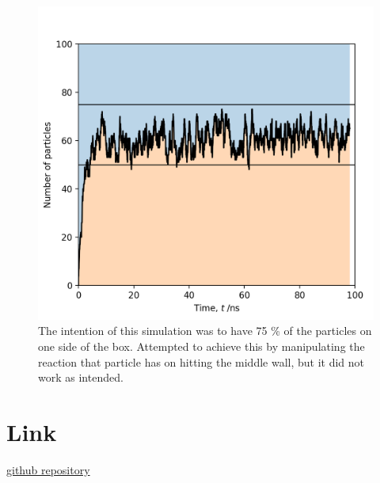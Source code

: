 \documentclass{article}
\begin{document}
\begin{figure}[H]
    \begin{minipage}[c]{0.5\textwidth}
    \includegraphics[width=\textwidth]{Figure_4.png}
    \end{minipage}\hfill
    \begin{minipage}[c]{0.5\textwidth}
    \caption{
        The intention of this simulation was to have 75 \% of the particles on one side of the box.
        Attempted to achieve this by manipulating the reaction that particle has on hitting the 
        middle wall, but it did not work as intended.
    } \label{fig:4}
    \end{minipage}
\end{figure}

\section{Link}

\href{https://github.com/sourabh-ch/ph456-computational}{github repository}
\end{document}
